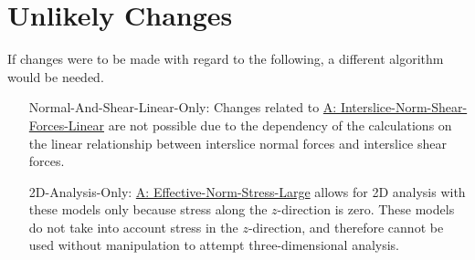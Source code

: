 \documentclass[12pt]{article}
\begin{document}
\section{Unlikely Changes}
\label{Sec:UCs}
If changes were to be made with regard to the following, a different algorithm would be needed.
\begin{itemize}
\item[Normal-And-Shear-Linear-Only:\phantomsection\label{UC_normshearlinear}]Changes related to \hyperref[assumpINSFL]{A: Interslice-Norm-Shear-Forces-Linear} are not possible due to the dependency of the calculations on the linear relationship between interslice normal forces and interslice shear forces.
\item[2D-Analysis-Only:\phantomsection\label{UC_2donly}]\hyperref[assumpENSL]{A: Effective-Norm-Stress-Large} allows for 2D analysis with these models only because stress along the $z$-direction is zero. These models do not take into account stress in the $z$-direction, and therefore cannot be used without manipulation to attempt three-dimensional analysis.
\end{itemize}
\end{document}

